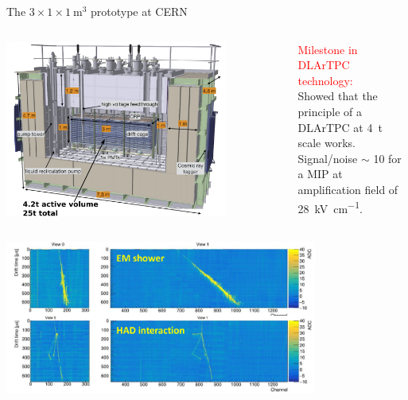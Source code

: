 \documentclass[10pt]{beamer}
\begin{document}
	\begin{frame}{The \texorpdfstring{$3 \times 1 \times \SI{1}{\meter\cubed}$}{311} prototype at CERN}
		\begin{columns}
			\begin{column}{0.48\textwidth}
				\centering
				\includegraphics[width=0.8\textwidth]{figures/311/311_2.png}
			\end{column}\hfill
			\begin{column}{0.48\textwidth}
				\begin{scriptsize}
					\textcolor{red}{Milestone in DLArTPC technology:} \\Showed that the principle of a DLArTPC at \SI{4}{\tonne} scale works.\\
					Signal/noise $\sim$ 10 for a MIP at amplification field of \SI{28}{\kilo\volt\per\centi\meter}.
				\end{scriptsize}
			\end{column}\hfill
		\end{columns}
		\centering
		\includegraphics[width=0.77\textwidth]{figures/311/events.png}\\
	\end{frame}
	    
\end{document}
